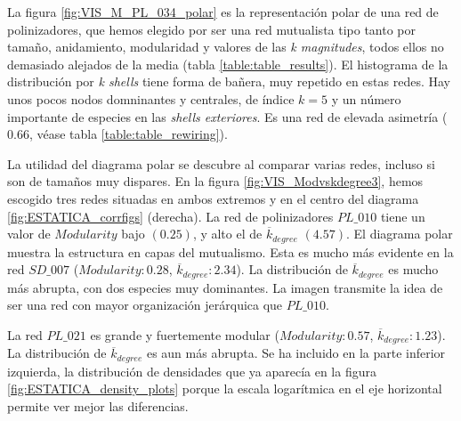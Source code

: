 La figura \ref{fig:VIS_M_PL_034_polar} es la representación polar de una red de polinizadores, que hemos elegido por ser una red mutualista tipo tanto por tamaño, anidamiento, modularidad y valores de las \textit{k magnitudes}, todos ellos no demasiado alejados de la media (tabla \ref{table:table_results}). El histograma de la distribución por \textit{k shells} tiene forma de bañera, muy repetido en estas redes. Hay unos pocos nodos domninantes y centrales, de índice $k = 5$ y un número importante de especies en las \textit{shells exteriores}. Es una red de elevada asimetría ($0.66$, véase tabla \ref{table:table_rewiring}).

La utilidad del diagrama polar se descubre al comparar varias redes, incluso si son de tamaños muy dispares. En la figura \ref{fig:VIS_Modvskdegree3}, hemos escogido tres redes situadas en ambos extremos y en el centro del diagrama \ref{fig:ESTATICA_corrfigs} (derecha). La red de polinizadores $PL\_010$  tiene un valor de $Modularity$ bajo $(0.25)$, y alto el de $\overline {k}_{degree}$ $(4.57)$. El diagrama polar muestra la estructura en capas del mutualismo. Esta es mucho más evidente en la red $SD\_007$ ($Modularity:    0.28$, $\overline {k}_{degree}: 2.34$). La distribución de $\overline {k}_{degree}$ es mucho más abrupta, con dos especies muy dominantes. La imagen transmite la idea de ser una red con mayor organización jerárquica que $PL\_010$.

La red $PL\_021$ es grande y fuertemente modular ($Modularity: 0.57$, $\overline {k}_{degree}: 1.23$). La distribución de $\overline {k}_{degree}$ es aun más abrupta. Se ha incluido en la parte inferior izquierda, la distribución de densidades que ya aparecía en la figura \ref{fig:ESTATICA_density_plots} porque la escala logarítmica en el eje horizontal permite ver mejor las diferencias.

